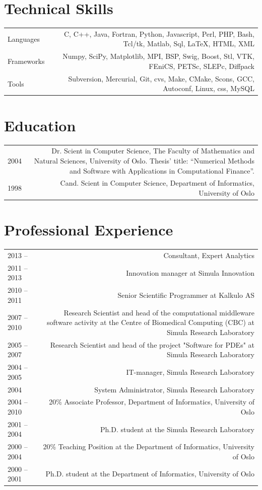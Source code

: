 \documentclass[english,a4paper,11pt]{article}
\begin{document}
\section*{Technical Skills}
\begin{tabular}{LR}
Languages& C, C++, Java, Fortran, Python, Javascript, Perl, PHP, Bash, Tcl/tk, Matlab, Sql, LaTeX, HTML, XML\\
Frameworks& Numpy, SciPy, Matplotlib, MPI, BSP, Swig, Boost, Stl, VTK, FEniCS, PETSc, SLEPc, Diffpack\\
Tools& Subversion, Mercurial, Git, cvs, Make, CMake, Scons, GCC, Autoconf, Linux, css, MySQL
\end{tabular}

\section*{Education}
\begin{tabular}{LR}
2004 & Dr. Scient in Computer Science, The Faculty of Mathematics and Natural Sciences, University of Oslo. Thesis’ title: ``Numerical Methods and Software with Applications in Computational Finance''.\\
1998 & Cand. Scient in Computer Science, Department of Informatics, University of Oslo
\end{tabular}

\section*{Professional Experience}
\begin{tabular}{LR}
2013 -- & Consultant, Expert Analytics\\
2011 -- 2013& Innovation manager at Simula Innovation\\
2010 -- 2011& Senior Scientific Programmer at Kalkulo AS\\
2007 -- 2010& Research Scientist and head of the computational middleware software activity at the Centre of Biomedical Computing (CBC) at Simula Research Laboratory\\
2005 -- 2007& Research Scientist and head of the project "Software for PDEs" at Simula Research Laboratory\\
2004 -- 2005& IT-manager, Simula Research Laboratory\\
2004& System Administrator, Simula Research Laboratory\\
2004 -- 2010& 20\% Associate Professor, Department of Informatics, University of Oslo\\
2001 -- 2004& Ph.D. student at the Simula Research Laboratory\\
2000 -- 2004& 20\% Teaching Position at the Department of Informatics, University of Oslo\\
2000 -- 2001& Ph.D. student at the Department of Informatics, University of Oslo\\
\end{tabular}
\end{document}
